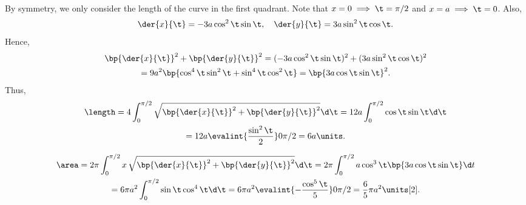 \begin{solution}
    \begin{ppart}
        By symmetry, we only consider the length of the curve in the first quadrant. Note that $x = 0 \implies \t = \pi/2$ and $x = a \implies \t = 0$. Also, \[\der{x}{\t} = -3a\cos^2 \t \sin \t, \quad \der{y}{\t} = 3a\sin^2 \t \cos \t.\] Hence,
        \begin{gather*}
            \bp{\der{x}{\t}}^2 + \bp{\der{y}{\t}}^2 = (-3a\cos^2 \t \sin \t)^2 + (3a\sin^2 \t \cos \t)^2 \\= 9a^2\bp{\cos^4 \t \sin^2 \t + \sin^4 \t \cos^2 \t} = \bp{3a\cos \t \sin \t}^2.
        \end{gather*}
        Thus,
        \begin{gather*}
            \length = 4 \int_0^{\pi/2} \sqrt{\bp{\der{x}{\t}}^2 + \bp{\der{y}{\t}}^2} \d \t = 12a \int_0^{\pi/2} \cos\t\sin\t \d \t \\
            = 12a \evalint{\frac{\sin^2 \t}2}0{\pi/2} = 6a \units.
        \end{gather*}
    \end{ppart}
    \begin{ppart}
        \begin{gather*}
            \area = 2\pi \int_0^{\pi/2} x \, \sqrt{\bp{\der{x}{\t}}^2 + \bp{\der{y}{\t}}^2} \d \t = 2\pi \int_0^{\pi/2} a \cos^3 \t \bp{3a \cos \t \sin \t} \d t \\
            = 6\pi a^2 \int_0^{\pi/2} \sin \t \cos^4 \t \d \t = 6\pi a^2 \evalint{-\frac{\cos^5 \t}{5}}0{\pi/2} = \frac65 \pi a^2 \units[2].
        \end{gather*}
    \end{ppart}
\end{solution}

